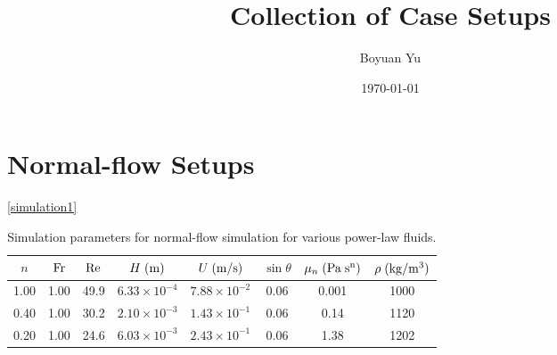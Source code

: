 \documentclass[a4paper]{article}
\title{Collection of Case Setups}
\author{
Boyuan Yu}
\date{\today}
\newcommand{\fr}{{\rm{Fr}}}
\newcommand{\sa}{\sin\theta}
\begin{document}
\maketitle
\section{Normal-flow Setups}
\autoref{simulation1}
\begin{table}[htbp]
		\centering
		\begin{tabular}{cccccccc}
			$n$ & $\fr$ & $\rm Re$ & $H\;{\rm (m)}$ & $U\;(\rm{m/s})$ & $\sa$  & $\mu_n\; ({\rm Pa \; s^n})$ & $\rho\;({\rm kg/m^3})$\\
			\toprule
			1.00 & 1.00 & 49.9 & $6.33\times10^{-4}$ & $7.88\times10^{-2}$ & 0.06 & 0.001 & 1000 \\
			
			0.40 & 1.00 & 30.2 & $2.10\times10^{-3}$ & $1.43\times10^{-1}$ & 0.06 & 0.14 & 1120 \\
			
			0.20 & 1.00 & 24.6 & $6.03\times10^{-3}$ & $2.43\times10^{-1}$ & 0.06 & 1.38 & 1202 \\
			
			\bottomrule 
		\end{tabular}
	\caption{Simulation parameters for normal-flow simulation for various power-law fluids.}
	\label{simulation1}
\end{table}
\end{document}
